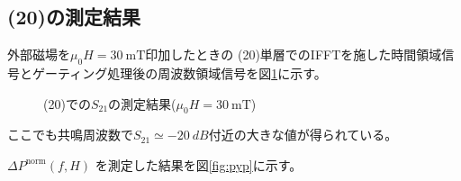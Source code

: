 \documentclass[dvipdfmx,11pt]{jsreport}
\numberwithin{equation}{chapter}
\numberwithin{table}{chapter}
\begin{document}
\subsection{(20)の測定結果}

外部磁場を$\mu_0 H=\SI{30}{\milli \tesla}$印加したときの
(20)単層でのIFFTを施した時間領域信号とゲーティング処理後の周波数領域信号を図\ref{fig:k5}に示す。
\begin{figure}[H]
	\centering
		\caption{(20)での$S_{21}$の測定結果($\mu_0 H=\SI{30}{\milli \tesla}$)}
    \label{fig:k5}
\end{figure}
ここでも共鳴周波数で$S_{21}\simeq \SI{-20}{dB}$付近の大きな値が得られている。

$\Delta P^{\text{norm}}(f,H)$ を測定した結果を図\ref{fig:pyp}に示す。
\end{document}
